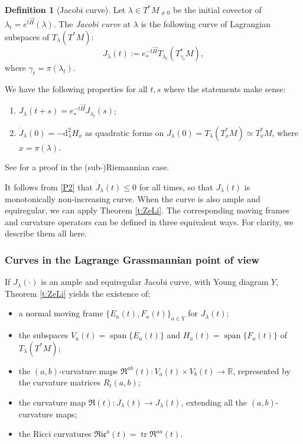 \documentclass[11pt,a4paper]{article}
\theoremstyle{plain}
\theoremstyle{definition}
\newtheorem{definition}[theorem]{Definition}
\theoremstyle{remark}
\numberwithin{equation}{section}
\newcommand{\R}{\mathbb{R}} %
\DeclareMathOperator{\spn}{\mathrm{span}}
\DeclareMathOperator{\tr}{\mathrm{tr}}
\newcommand{\di}{\mathrm{d}}
\begin{document}
\begin{definition}[Jacobi curve]\label{def:Jlambdat}
Let $\lambda \in T^*M_{\neq 0}$ be the initial covector of $\lambda_t = e^{t\vec{H}}(\lambda)$. The \emph{Jacobi curve} at $\lambda$ is the following curve of Lagrangian subspaces of $T_\lambda(T^*M)$:
\begin{equation}
J_\lambda(t) := e^{-t\vec{H}}_* T_{\lambda_t}(T^*_{\gamma_t}M),
\end{equation}
where $\gamma_t = \pi(\lambda_t)$.
\end{definition}

We have the following properties for all $t,s$ where the statements make sense:
\begin{enumerate}[label=(P\arabic*)]
\item\label{P1} $J_\lambda(t+s) = e^{-t\vec{H}}_* J_{\lambda_t}(s)$;
\item\label{P2} $\dot{J}_{\lambda}(0) = -\di^2_\lambda H_x$ as quadratic forms on $J_\lambda(0) = T_\lambda(T^*_xM) \simeq T^*_xM$, where $x=\pi(\lambda)$.
\end{enumerate}
See \cite[Prop.\@ 15.2]{nostrolibro} for a proof in the (sub-)Riemannian case.

It follows from \ref{P2} that $\dot{J}_\lambda(t)\leq 0$ for all times, so that $J_\lambda(t)$ is monotonically non-increasing curve. When the curve is also ample and equiregular, we can apply Theorem \ref{t:ZeLi}. The corresponding moving frames and curvature operators can be defined in three equivalent ways. For clarity, we describe them all here.


\subsubsection{Curves in the Lagrange Grassmannian point of view} \label{sec:can-LagGrass}

If $J_\lambda(\cdot)$ is an ample and equiregular Jacobi curve, with Young diagram $Y$, Theorem \ref{t:ZeLi} yields the existence of:
\begin{itemize}
\item a normal moving frame $\{E_a(t),F_a(t)\}_{a\in Y}$ for $J_\lambda(t)$;
\item the subspaces $V_a(t) = \spn\{E_a(t)\}$ and $H_a(t) = \spn\{F_a(t)\}$ of $T_{\lambda}(T^*M)$;
\item the $(a,b)$-curvature maps $\mathfrak{R}^{ab}(t): V_a(t)\times V_b(t)\to \R$, represented by the curvature matrices $R_t(a,b)$;
\item the curvature map $\mathfrak{R}(t): J_{\lambda}(t)\to J_{\lambda}(t)$, extending all the $(a,b)$-curvature maps;
\item the Ricci curvatures $\mathfrak{Ric}^a(t)= \tr \mathfrak{R}^{aa}(t)$.
\end{itemize}
\end{document}
